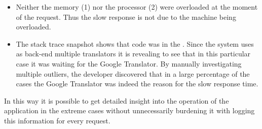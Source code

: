 \begin{itemize}

  \item Neither the memory (1) nor the processor (2) were overloaded at the moment of the request. Thus the slow response is not due to the machine being overloaded.

  \item The stack trace snapshot shows that code was in the . Since the system uses as back-end multiple translators it is revealing to see that in this particular case it was waiting for the Google Translator. By manually investigating multiple outliers, the developer discovered that in a large percentage of the cases the Google Translator was indeed the reason for the slow response time.

\end{itemize}

  \niceseparator

  In this way it is possible to get detailed insight into the operation of the application in the extreme cases without unnecessarily burdening it with logging this information for every request. 




